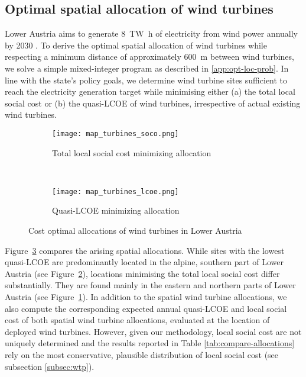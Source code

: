 \documentclass[review, a4paper, 12pt, authoryear, times]{elsarticle}
\begin{document}
\subsection{Optimal spatial allocation of wind turbines} \label{subsec:alloc}
Lower Austria aims to generate \SI{8}{\tera\watt\hour} of electricity from wind power annually by 2030 \citep{ENU2023}.
To derive the optimal spatial allocation of wind turbines while respecting a minimum distance of approximately \SI{600}{\metre} between wind turbines, we solve a simple mixed-integer program as described in \ref{app:opt-loc-prob}.
In line with the state's policy goals, we determine wind turbine sites sufficient to reach the electricity generation target while minimising either (a) the total local social cost or (b) the quasi-LCOE of wind turbines, irrespective of actual existing wind turbines.
%
\begin{figure}
    \centering
    \begin{subfigure}[t]{0.5\textwidth}
        \centering
        \texttt{[image: map\_turbines\_soco.png]}
        \caption{Total local social cost minimizing allocation}
        \label{fig:optcost-a-soco}
    \end{subfigure}%
    ~ 
    \begin{subfigure}[t]{0.5\textwidth}
        \centering
        \texttt{[image: map\_turbines\_lcoe.png]}
        \caption{Quasi-LCOE minimizing allocation}
        \label{fig:optcost-b-lcoe}
    \end{subfigure}
    \caption{Cost optimal allocations of wind turbines in Lower Austria}
    \label{fig:optcost}
\end{figure}
%
Figure~\ref{fig:optcost} compares the arising spatial allocations.
While sites with the lowest quasi-LCOE are predominantly located in the alpine, southern part of Lower Austria (see Figure~\ref{fig:optcost-b-lcoe}), locations minimising the total local social cost differ substantially. 
They are found mainly in the eastern and northern parts of Lower Austria (see Figure~\ref{fig:optcost-a-soco}).
In addition to the spatial wind turbine allocations, we also compute the corresponding expected annual quasi-LCOE and local social cost of both spatial wind turbine allocations, evaluated at the location of deployed wind turbines.
However, given our methodology, local social cost are not uniquely determined and the results reported in Table \ref{tab:compare-allocations} rely on the most conservative, plausible distribution of local social cost  (see subsection \ref{subsec:wtp}).
\end{document}

